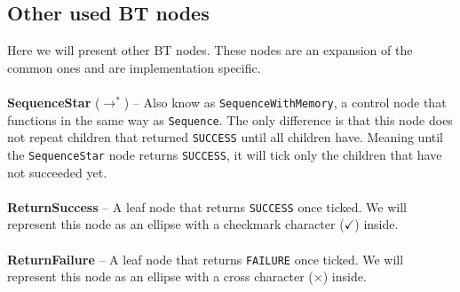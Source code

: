     \subsection{Other used BT nodes}
        Here we will present other BT nodes. These nodes are an expansion of the common ones and are implementation specific.\\\\
        \textbf{SequenceStar} ($\to^{*}$) -- Also know as \texttt{SequenceWithMemory}, a control node that functions in the same way as \texttt{Sequence}. The only difference is that this node does not repeat children that returned \texttt{SUCCESS} until all children have. Meaning until the \texttt{SequenceStar} node returns \texttt{SUCCESS}, it will tick only the children that have not succeeded yet.\\\\
        \textbf{ReturnSuccess} -- A leaf node that returns \texttt{SUCCESS} once ticked. We will represent this node as an ellipse with a checkmark character ($\checkmark$) inside.\\\\
        \textbf{ReturnFailure} -- A leaf node that returns \texttt{FAILURE} once ticked. We will represent this node as an ellipse with a cross character ($\times$) inside.

